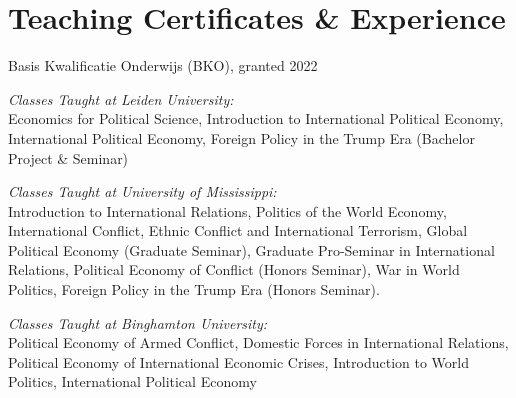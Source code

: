 \documentclass[letterpaper]{article}
\renewenvironment{itemize}{
  \begin{list}{}{
    \setlength{\leftmargin}{1.75em}
  }
}{
  \end{list}
}
\begin{document}
\section*{Teaching Certificates \& Experience}


\begin{itemize}

\item Basis Kwalificatie Onderwijs (BKO), granted 2022 \\


\item \emph{Classes Taught at Leiden University:} \\ 

Economics for Political Science, Introduction to International Political Economy, International Political Economy, Foreign Policy in the Trump Era (Bachelor Project \& Seminar)

\item \emph{Classes Taught at University of Mississippi:}\\
Introduction to International Relations, Politics of the World Economy, International Conflict, Ethnic Conflict and International Terrorism, Global Political Economy (Graduate Seminar), Graduate Pro-Seminar in International Relations, Political Economy of Conflict (Honors Seminar), War in World Politics, Foreign Policy in the Trump Era (Honors Seminar). 

\item \emph{Classes Taught at Binghamton University:}\\
Political Economy of Armed Conflict, Domestic Forces in International Relations, Political Economy of International Economic Crises, Introduction to World Politics, International Political Economy	
\end{itemize}

	
\end{document}
